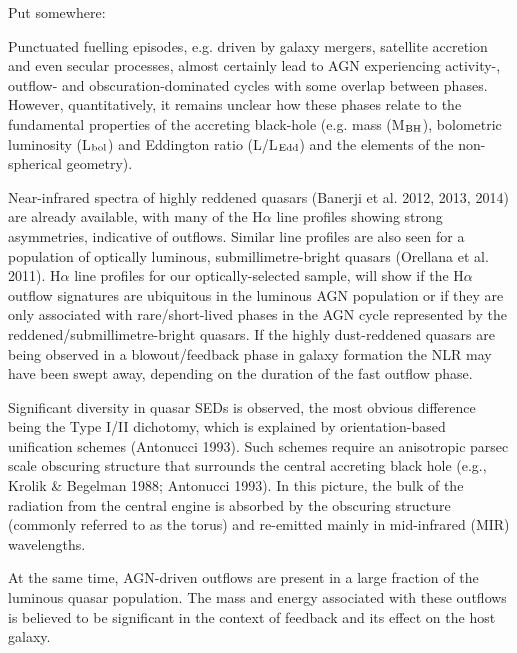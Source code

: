 Put somewhere: 


Punctuated fuelling episodes, e.g. driven by galaxy mergers, satellite accretion and even secular processes,
almost certainly lead to AGN experiencing activity-, outflow- and obscuration-dominated cycles with some overlap between phases. 
However, quantitatively, it remains unclear how these phases relate to the fundamental properties of the accreting black-hole (e.g.  mass (M$_{\rm{BH}}$), bolometric luminosity (L$_{\rm{bol}}$) and Eddington ratio (L/L$_{\rm{Edd}}$) and the elements of the non-spherical geometry).



Near-infrared spectra of highly reddened quasars (Banerji et al. 2012, 2013, 2014) are already available, with many of the H$\alpha$ line profiles showing strong asymmetries, indicative of outflows. 
Similar line profiles are also seen for a population of optically luminous, submillimetre-bright quasars (Orellana et al. 2011). 
H$\alpha$ line profiles for our optically-selected sample, will show if the H$\alpha$ outflow signatures are ubiquitous in the luminous AGN population or if they are only associated with rare/short-lived phases in the AGN cycle represented by the reddened/submillimetre-bright quasars.
If the highly dust-reddened quasars are being observed in a blowout/feedback phase in galaxy formation the NLR may have been swept away, depending on the duration of the fast outflow phase.



Significant diversity in quasar SEDs is observed, the most obvious difference being the Type I/II dichotomy, which is explained by orientation-based unification schemes (Antonucci 1993). 
Such schemes require an anisotropic parsec scale obscuring structure that surrounds the central accreting black hole (e.g., Krolik \& Begelman 1988; Antonucci 1993). 
In this picture, the bulk of the radiation from the central engine is absorbed by the obscuring structure (commonly referred to as the torus) and re-emitted mainly in mid-infrared (MIR) wavelengths.  

At the same time, AGN-driven outflows are present in a large fraction of the luminous quasar population. 
The mass and energy associated with these outflows is believed to be significant in the context of feedback and its effect on the host galaxy. 

